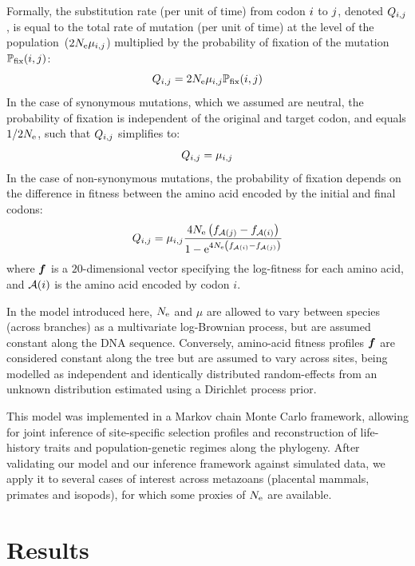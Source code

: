 \documentclass{article}
\begin{document}
    Formally, the {substitution} rate (per unit of time) from {codon} ${i}$ to ${j}$, denoted $Q_{{i}, {j}}$, is equal to the total rate of mutation (per unit of time) at the level of the population~($2N_{\text{e}}\mu_{{i}, {j}}$) multiplied by the probability of fixation of the mutation $\mathbb{P}_{\text{fix}}({i}, {j})$:
    \begin{equation}
    {Q_{{i}, {j}}}
        = 2 N_{\text{e}} \mu_{{i}, {j}} \mathbb{P}_{\text{fix}}({i}, {j})
    \end{equation}
    In the case of {synonymous} mutations, which we assumed are {neutral}, the probability of fixation is independent of the original and target {codon}, and equals $1/2 N_{\text{e}}$, such that ${Q_{{i}, {j}}}$ simplifies to:
    \begin{equation}
        Q_{{i}, {j}} = \mu_{{i}, {j}}
    \end{equation}
    In the case of {non-synonymous} mutations, the probability of fixation depends on the difference in fitness between the amino acid encoded by the initial and final codons:
    \begin{equation}
        \label{eq:mutationSelection}
        {Q_{{i}, {j}}} = \mu_{{i}, {j}} \dfrac{4 N_{\text{e}} \left({f_{\mathcal{A}({j})} - f_{\mathcal{A}({i})}}\right)}{{1 - \text{e}^{4 N_{\text{e}} \left({f_{\mathcal{A}({i})} - f_{\mathcal{A}({j})}}\right)} }}
    \end{equation}
    where $\bm{f}$ is a $20$-dimensional vector specifying the log-fitness for each amino acid, and $\mathcal{A}({i})$ is the amino acid encoded by {codon} $i$.

    In the model introduced here, $N_{\text{e}}$ and $\mu$ are allowed to vary between species (across branches) as a multivariate log-Brownian process, but are assumed constant along the {DNA} sequence.
    Conversely, amino-acid fitness profiles $\bm{f}$ are considered constant along the tree but are assumed to vary across sites, being modelled as independent and identically distributed random-effects from an unknown distribution estimated using a {Dirichlet process} {prior}.

    This model was implemented in a {Markov chain Monte Carlo} framework, allowing for joint inference of site-specific selection profiles and reconstruction of life-history traits and population-genetic regimes along the phylogeny.
    After validating our model and our inference framework against simulated data, we apply it to several cases of interest across metazoans (placental mammals, primates and isopods), for which some proxies of $N_{\text{e}}$ are available.


    \section{Results}
    \label{sec:Results}
\end{document}

